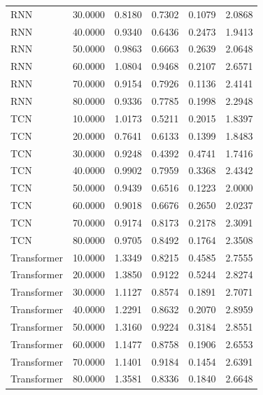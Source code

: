 \begin{tabular}{lrrrrr}
RNN & 30.0000 & 0.8180 & 0.7302 & 0.1079 & 2.0868 \\
RNN & 40.0000 & 0.9340 & 0.6436 & 0.2473 & 1.9413 \\
RNN & 50.0000 & 0.9863 & 0.6663 & 0.2639 & 2.0648 \\
RNN & 60.0000 & 1.0804 & 0.9468 & 0.2107 & 2.6571 \\
RNN & 70.0000 & 0.9154 & 0.7926 & 0.1136 & 2.4141 \\
RNN & 80.0000 & 0.9336 & 0.7785 & 0.1998 & 2.2948 \\
TCN & 10.0000 & 1.0173 & 0.5211 & 0.2015 & 1.8397 \\
TCN & 20.0000 & 0.7641 & 0.6133 & 0.1399 & 1.8483 \\
TCN & 30.0000 & 0.9248 & 0.4392 & 0.4741 & 1.7416 \\
TCN & 40.0000 & 0.9902 & 0.7959 & 0.3368 & 2.4342 \\
TCN & 50.0000 & 0.9439 & 0.6516 & 0.1223 & 2.0000 \\
TCN & 60.0000 & 0.9018 & 0.6676 & 0.2650 & 2.0237 \\
TCN & 70.0000 & 0.9174 & 0.8173 & 0.2178 & 2.3091 \\
TCN & 80.0000 & 0.9705 & 0.8492 & 0.1764 & 2.3508 \\
Transformer & 10.0000 & 1.3349 & 0.8215 & 0.4585 & 2.7555 \\
Transformer & 20.0000 & 1.3850 & 0.9122 & 0.5244 & 2.8274 \\
Transformer & 30.0000 & 1.1127 & 0.8574 & 0.1891 & 2.7071 \\
Transformer & 40.0000 & 1.2291 & 0.8632 & 0.2070 & 2.8959 \\
Transformer & 50.0000 & 1.3160 & 0.9224 & 0.3184 & 2.8551 \\
Transformer & 60.0000 & 1.1477 & 0.8758 & 0.1906 & 2.6553 \\
Transformer & 70.0000 & 1.1401 & 0.9184 & 0.1454 & 2.6391 \\
Transformer & 80.0000 & 1.3581 & 0.8336 & 0.1840 & 2.6648 \\
\bottomrule
\end{tabular}
